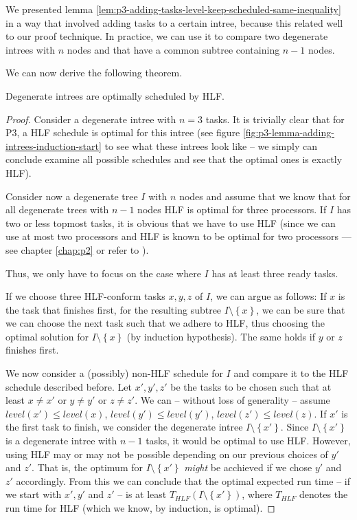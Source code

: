 We presented lemma \ref{lem:p3-adding-tasks-level-keep-scheduled-same-inequality} in a way that involved adding tasks to a certain intree, because this related well to our proof technique. In practice, we can use it to compare two degenerate intrees with $n$ nodes and that have a common subtree containing $n-1$ nodes.

We can now derive the following theorem.

\begin{theorem}
  Degenerate intrees are optimally scheduled by HLF.
\end{theorem}

\begin{proof}
  Consider a degenerate intree with $n=3$ tasks. It is trivially clear that for P3, a HLF schedule is optimal for this intree (see figure \ref{fig:p3-lemma-adding-intrees-induction-start} to see what these intrees look like -- we simply can conclude examine all possible schedules and see that the optimal ones is exactly HLF).
  
  Consider now a degenerate tree $I$ with $n$ nodes and assume that we know that for all degenerate trees with $n-1$ nodes HLF is optimal for three processors. If $I$ has two or less topmost tasks, it is obvious that we have to use HLF (since we can use at most two processors and HLF is known to be optimal for two processors --- see chapter \ref{chap:p2} or refer to \cite{chandyreynoldsshortpaper1975}).

  Thus, we only have to focus on the case where $I$ has at least three ready tasks.

  If we choose three HLF-conform tasks $x,y,z$ of $I$, we can argue as follows: If $x$ is the task that finishes first, for the resulting subtree $I\setminus \left\{ x \right\}$, we can be sure that we can choose the next task such that we adhere to HLF, thus choosing the optimal solution for $I\setminus\left\{ x \right\}$ (by induction hypothesis). The same holds if $y$ or $z$ finishes first.
  
  We now consider a (possibly) non-HLF schedule for $I$ and compare it to the HLF schedule described before.
  Let $x',y',z'$ be the tasks to be chosen such that at least $x\neq x'$ or $y\neq y'$ or $z\neq z'$. We can -- without loss of generality -- assume $level(x')\leq level(x)$, $level(y')\leq level(y')$, $level(z')\leq level(z)$. If $x'$ is the first task to finish, we consider the degenerate intree $I\setminus\left\{ x' \right\}$. Since $I \setminus \left\{ x' \right\}$ is a degenerate intree with $n-1$ tasks, it would be optimal to use HLF. However, using HLF may or may not be possible depending on our previous choices of $y'$ and $z'$. That is, the optimum for $I\setminus\left\{ x' \right\}$ \emph{might} be acchieved if we chose $y'$ and $z'$ accordingly. From this we can conclude that the optimal expected run time -- if we start with $x',y'$ and $z'$ -- is at least $T_{HLF}\left( I\setminus\left\{ x' \right\} \right)$, where $T_{HLF}$ denotes the run time for HLF (which we know, by induction, is optimal).


\end{proof}
